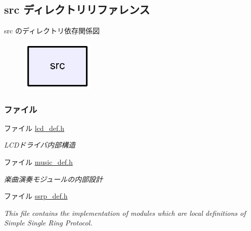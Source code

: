 \subsection{src ディレクトリリファレンス}
\label{dir_68267d1309a1af8e8297ef4c3efbcdba}
src のディレクトリ依存関係図\nopagebreak
\begin{figure}[H]
\begin{center}
\leavevmode
\includegraphics[width=98pt]{dir_68267d1309a1af8e8297ef4c3efbcdba_dep}
\end{center}
\end{figure}
\subsubsection*{ファイル}
\begin{DoxyCompactItemize}
\item 
ファイル \hyperlink{lcd__def_8h}{lcd\+\_\+def.\+h}
\begin{DoxyCompactList}\small\item\em L\+C\+Dドライバ内部構造 \end{DoxyCompactList}\item 
ファイル \hyperlink{music__def_8h}{music\+\_\+def.\+h}
\begin{DoxyCompactList}\small\item\em 楽曲演奏モジュールの内部設計 \end{DoxyCompactList}\item 
ファイル \hyperlink{ssrp__def_8h}{ssrp\+\_\+def.\+h}
\begin{DoxyCompactList}\small\item\em This file contains the implementation of modules which are local definitions of Simple Single Ring Protocol. \end{DoxyCompactList}\end{DoxyCompactItemize}
